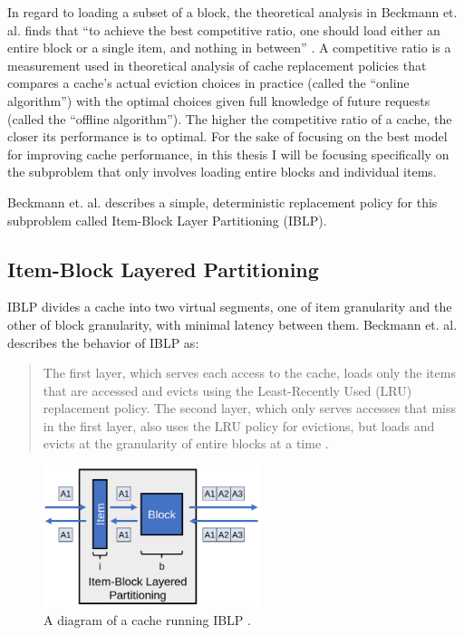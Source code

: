 \documentclass[12pt,twoside]{reedthesis}
\begin{document}
In regard to loading a subset of a block, the theoretical analysis in Beckmann et. al. finds that ``to achieve the best competitive ratio, one should load either an entire block or a single item, and nothing in between'' \cite{beckmann}. A competitive ratio is a measurement used in theoretical analysis of cache replacement policies that compares a cache's actual eviction choices in practice (called the ``online algorithm'') with the optimal choices given full knowledge of future requests (called the ``offline algorithm''). The higher the competitive ratio of a cache, the closer its performance is to optimal. For the sake of focusing on the best model for improving cache performance, in this thesis I will be focusing specifically on the subproblem that only involves loading entire blocks and individual items.

Beckmann et. al. describes a simple, deterministic replacement policy for this subproblem called Item-Block Layer Partitioning (IBLP).

	\subsection*{Item-Block Layered Partitioning}

	IBLP divides a cache into two virtual segments, one of item granularity and the other of block granularity, with minimal latency between them. Beckmann et. al. describes the behavior of IBLP as: \begin{quote}
		The first layer, which serves each access to the cache, loads only the items that are accessed and evicts using the Least-Recently Used (LRU) replacement policy. The second layer, which only serves accesses that miss in the first layer, also uses the LRU policy for evictions, but loads and evicts at the granularity of entire blocks at a time \cite{beckmann}.
	\end{quote}

	\begin{figure}[h]
		\centering
		\includegraphics[width=2.5in]{figures/IBLP.png}
		\caption{A diagram of a cache running IBLP \cite{beckmann}.}
	\end{figure}
\end{document}
